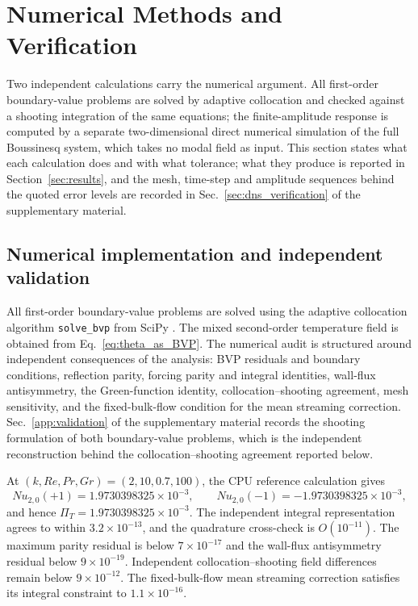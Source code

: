 \documentclass[12pt,a4paper]{article}
\newcommand{\Rey}{\mathit{Re}}
\newcommand{\Grr}{\mathit{Gr}}
\newcommand{\Nu}{\mathit{Nu}}
\renewcommand{\Pr}{\mathit{Pr}}
\newcommand{\PiT}{\Pi_T}
\begin{document}
\section{Numerical Methods and Verification}
\label{sec:methods}

Two independent calculations carry the numerical argument. All first-order
boundary-value problems are solved by adaptive collocation and checked against a
shooting integration of the same equations; the finite-amplitude response is
computed by a separate two-dimensional direct numerical simulation of the full
Boussinesq system, which takes no modal field as input. This section states what
each calculation does and with what tolerance; what they produce is reported in
Section~\ref{sec:results}, and the mesh, time-step and amplitude sequences behind
the quoted error levels are recorded in Sec.~\ref{sec:dns_verification} of the
supplementary material.

\subsection{Numerical implementation and independent validation}

All first-order boundary-value problems are solved using the adaptive collocation algorithm
\texttt{solve\_bvp} from SciPy \cite{Virtanen2020}. The mixed second-order temperature field is obtained
from Eq.~\eqref{eq:theta_as_BVP}. The numerical audit is structured around independent consequences of the
analysis: BVP residuals and boundary conditions, reflection parity, forcing parity and integral identities,
wall-flux antisymmetry, the Green-function identity, collocation--shooting agreement, mesh sensitivity, and
the fixed-bulk-flow condition for the mean streaming correction. Sec.~\ref{app:validation} of the supplementary material
records the shooting formulation of both boundary-value problems, which is the independent reconstruction
behind the collocation--shooting agreement reported below.

At $(k,\Rey,\Pr,\Grr)=(2,10,0.7,100)$, the CPU reference calculation gives
\begin{equation}
  \Nu_{2,0}(+1)=1.9730398325\times10^{-3},\qquad
  \Nu_{2,0}(-1)=-1.9730398325\times10^{-3},
\end{equation}
and hence $\PiT=1.9730398325\times10^{-3}$. The independent integral representation agrees to within
$3.2\times10^{-13}$, and the quadrature cross-check is $O(10^{-11})$. The maximum parity residual is
below $7\times10^{-17}$ and the wall-flux antisymmetry residual below $9\times10^{-19}$. Independent
collocation--shooting field differences remain below $9\times10^{-12}$. The fixed-bulk-flow mean streaming
correction satisfies its integral constraint to $1.1\times10^{-16}$.
\end{document}
